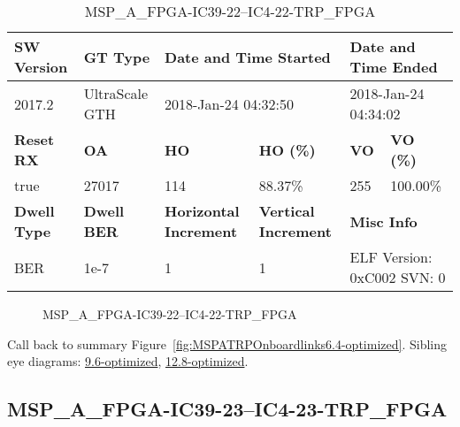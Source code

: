 \begin{table}[h]
\centering
\caption{MSP\_A\_FPGA-IC39-22--IC4-22-TRP\_FPGA}
\label{tab:MSPAFPGAIC3922IC422TRPFPGA6.4-optimized}
\begin{tabular}{@{}|l|l|l|l|l|l|@{}}
\toprule
\textbf{SW Version}                & \textbf{GT Type}   & \multicolumn{2}{l|}{\textbf{Date and Time Started}}            & \multicolumn{2}{l|}{\textbf{Date and Time Ended}}        \\ \midrule
2017.2                       & UltraScale GTH          & \multicolumn{2}{l|}{2018-Jan-24 04:32:50}                   & \multicolumn{2}{l|}{2018-Jan-24 04:34:02}               \\ \midrule
\textbf{Reset RX}                  & \textbf{OA} & \textbf{HO}   & \textbf{HO (\%)} & \textbf{VO} & \textbf{VO (\%)} \\ \midrule
true & 27017        & 114          & 88.37\%        & 255        & 100.00\%       \\ \midrule
\textbf{Dwell Type}                & \textbf{Dwell BER} & \textbf{Horizontal Increment} & \textbf{Vertical Increment}    & \multicolumn{2}{l|}{\textbf{Misc Info}}                  \\ \midrule
BER                            & 1e-7        & 1        & 1           & \multicolumn{2}{l|}{ELF Version: 0xC002 SVN: 0}                         \\ \bottomrule
\end{tabular}
\end{table}

\begin{figure}[h]
\caption{MSP\_A\_FPGA-IC39-22--IC4-22-TRP\_FPGA} \label{fig:MSPAFPGAIC3922IC422TRPFPGA6.4-optimized}
\end{figure}

Call back to summary Figure~\ref{fig:MSPATRPOnboardlinks6.4-optimized}.
Sibling eye diagrams: \hyperref[sec:MSPAFPGAIC3922IC422TRPFPGA9.6-optimized]{9.6-optimized}, \hyperref[sec:MSPAFPGAIC3922IC422TRPFPGA12.8-optimized]{12.8-optimized}.

\clearpage
\newpage


\subsection{MSP\_A\_FPGA-IC39-23--IC4-23-TRP\_FPGA}\label{sec:MSPAFPGAIC3923IC423TRPFPGA6.4-optimized}

